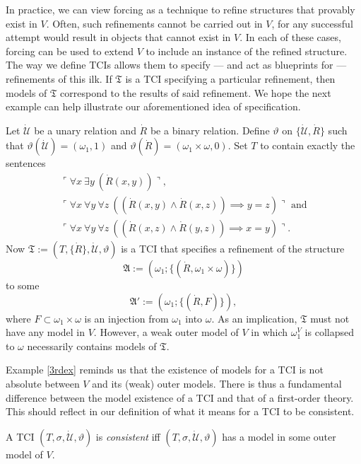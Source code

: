 \documentclass[12pt]{article}
\numberwithin{equation}{section}
\begin{document}
In practice, we can view forcing as a technique to refine structures that provably exist in $V$. Often, such refinements cannot be carried out in $V$, for any successful attempt would result in objects that cannot exist in $V$. In each of these cases, forcing can be used to extend $V$ to include an instance of the refined structure. The way we define TCIs allows them to specify --- and act as blueprints for --- refinements of this ilk. If $\mathfrak{T}$ is a TCI specifying a particular refinement, then models of $\mathfrak{T}$ correspond to the results of said refinement. We hope the next example can help illustrate our aforementioned idea of specification.

\begin{ex}\label{3rdex}
Let $\dot{\mathcal{U}}$ be a unary relation and $\dot{R}$ be a binary relation. Define $\vartheta$ on $\{\dot{\mathcal{U}}, \dot{R}\}$ such that $\vartheta(\dot{\mathcal{U}}) = (\omega_1, 1)$ and $\vartheta(\dot{R}) = (\omega_1 \times \omega, 0)$. Set $T$ to contain exactly the sentences 
\begin{gather*}
    \ulcorner \forall x \ \exists y \ (\dot{R}(x, y)) \urcorner \text{,} \\
    \ulcorner \forall x \ \forall y \ \forall z \ ((\dot{R}(x, y) \wedge \dot{R}(x, z)) \implies y = z) \urcorner \text{ and} \\
    \ulcorner \forall x \ \forall y \ \forall z \ ((\dot{R}(x, z) \wedge \dot{R}(y, z)) \implies x = y) \urcorner \text{.}
\end{gather*}
Now $\mathfrak{T} := (T, \{\dot{R}\}, \dot{\mathcal{U}}, \vartheta)$ is a TCI that specifies a refinement of the structure $$\mathfrak{A} := (\omega_1; \{(\dot{R}, \omega_1 \times \omega)\})$$ to some $$\mathfrak{A}' := (\omega_1; \{(\dot{R}, F)\}),$$ where $F \subset \omega_1 \times \omega$ is an injection from $\omega_1$ into $\omega$. As an implication, $\mathfrak{T}$ must not have any model in $V$. However, a weak outer model of $V$ in which $\omega_1^V$ is collapsed to $\omega$ necessarily contains models of $\mathfrak{T}$.
\end{ex}

Example \ref{3rdex} reminds us that the existence of models for a TCI is not absolute between $V$ and its (weak) outer models. There is thus a fundamental difference between the model existence of a TCI and that of a first-order theory. This should reflect in our definition of what it means for a TCI to be consistent.

\begin{defi}
A TCI $(T, \sigma, \dot{\mathcal{U}}, \vartheta)$ is \emph{consistent} iff $(T, \sigma, \dot{\mathcal{U}}, \vartheta)$ has a model in some outer model of $V$. 
\end{defi}
\end{document}
